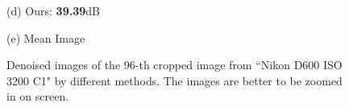 \documentclass[10pt,twocolumn,letterpaper]{article}
\begin{document}
\begin{figure}
{\begin{minipage}[t]{0.195\textwidth}
{\footnotesize (d) Ours: \textbf{39.39}dB }
\end{minipage}
\begin{minipage}[t]{0.195\textwidth}
\centering
{}
{\footnotesize (e) Mean Image \cite{crosschannel2016}}
\end{minipage}
}
\caption{Denoised images of the $96$-th cropped image from ``Nikon D600 ISO 3200 C1" \cite{crosschannel2016} by different methods. The images are better to be zoomed in on screen.}
\vspace{-3mm}
\label{fig2}
\end{figure}
\end{document}
